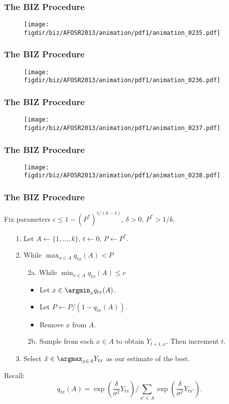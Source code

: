 \documentclass[13pt]{beamer}
\newcommand{\figdir}{../../fig}
\newcommand{\xhat}{\hat{x}}
\newcommand{\upthresh}{P}
\begin{document}
\begin{frame}\frametitle{The BIZ Procedure}\begin{figure}\texttt{[image: \\figdir/biz/AFOSR2013/animation/pdf1/animation\_0235.pdf]}\end{figure}\end{frame}
\begin{frame}\frametitle{The BIZ Procedure}\begin{figure}\texttt{[image: \\figdir/biz/AFOSR2013/animation/pdf1/animation\_0236.pdf]}\end{figure}\end{frame}
\begin{frame}\frametitle{The BIZ Procedure}\begin{figure}\texttt{[image: \\figdir/biz/AFOSR2013/animation/pdf1/animation\_0237.pdf]}\end{figure}\end{frame}
\begin{frame}\frametitle{The BIZ Procedure}\begin{figure}\texttt{[image: \\figdir/biz/AFOSR2013/animation/pdf1/animation\_0238.pdf]}\end{figure}\end{frame}





\begin{frame}
  \frametitle{The BIZ Procedure}
  Fix parameters $c \le 1-(P^*)^{1/(k-1)}$, $\delta>0$, $P^*>1/k$.
  \begin{itemize}
    \item[1.] Let $A \leftarrow \{ 1,\ldots, k\}$, $t\leftarrow 0$, $\upthresh \leftarrow P^*$.
    \item[2.] While $\max_{x\in A} q_{tx}(A) < \upthresh$
    \begin{itemize}
      \item[2a.] While $\min_{x\in A} q_{tx}(A) \le c$
      \begin{itemize}
	\item Let $x \in \argmin_x q_{tx}(A)$.
	\item Let $\upthresh \leftarrow \upthresh/(1-q_{tx}(A))$.
	\item Remove $x$ from $A$.
      \end{itemize}
    \item[2b.] Sample from each $x\in A$ to obtain $Y_{t+1,x}$.  Then increment $t$.
    \end{itemize}
  \item[3.] Select $\xhat \in \argmax_{x\in A} Y_{tx}$ as our estimate of the best.
  \end{itemize}
  \bigskip
  Recall:
\begin{equation*}
  q_{tx}(A) = \exp\left(\frac{\delta}{\sigma^2} Y_{tx}\right) \bigg/ \sum_{x'\in A} \exp\left(\frac{\delta}{\sigma^2} Y_{tx'}\right).
\end{equation*}
\end{frame} 
\end{document}
